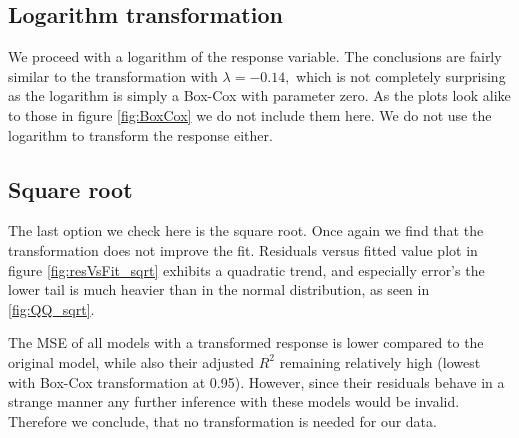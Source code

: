 \documentclass[12pt]{article}
\begin{document}
\subsection{Logarithm transformation}
We proceed with a logarithm of the response variable. The conclusions are fairly similar to the transformation with $\lambda=-0.14,$ which
is not completely surprising as the logarithm is simply a Box-Cox with parameter zero. As the plots look alike to those in figure \ref{fig:BoxCox}
we do not include them here. We do not use the logarithm to transform the response
either.

\subsection{Square root}
The last option we check here is the square root. Once again we find that the transformation does not improve the fit. Residuals versus
fitted value plot in figure \ref{fig:resVsFit_sqrt} exhibits a quadratic trend, and especially error's the lower tail is much heavier
than in the normal distribution, as seen in \ref{fig:QQ_sqrt}.

The MSE of all models with a transformed response is lower compared to the original model, while also their adjusted $R^2$ remaining
relatively high (lowest with Box-Cox transformation at 0.95). However, since their residuals behave in a strange manner any further inference
with these models would be invalid. Therefore we conclude, that no transformation is needed for our data.
\end{document}
